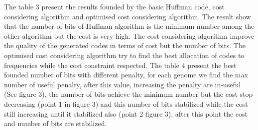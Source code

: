 \documentclass[preprint,12pt]{elsarticle}
\begin{document}
The table 3 present the results founded by the basic Huffman code, cost considering algorithm and optimised cost considering algorithm. The result show that the number of bits of Huffman algorithm is the minimum number among the other algorithm but the cost is  very high. The cost considering algorithm improve the quality of the generated codes in terms of cost but the number of bits. The optimised cost considering algorithm try to find the best allocation of codes to frequencies while the cost constraint respected. The table 4 present the best founded number of bits with different penalty, for each genome we find the max number of useful penalty, after this value, increasing the penalty are in-useful (See figure 3), the number of bits achieve the minimum number but the cost stop decreasing (point 1 in figure 3) and this number of bits stabilized while the cost still increasing until it stabilized also (point 2 figure 3), after this point the cost and number of bits are stabilized.
\end{document}
